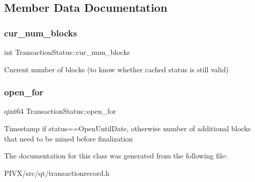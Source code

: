 \subsection{Member Data Documentation}
\mbox{\label{class_transaction_status_a22839cc23993e849a6c9fed8bffd5f50}} 
\subsubsection{\texorpdfstring{cur\+\_\+num\+\_\+blocks}{cur\_num\_blocks}}
{\footnotesize\ttfamily int Transaction\+Status\+::cur\+\_\+num\+\_\+blocks}

Current number of blocks (to know whether cached status is still valid) \mbox{\label{class_transaction_status_a861ed66c0fd49440bc1aacab5315a938}} 
\subsubsection{\texorpdfstring{open\+\_\+for}{open\_for}}
{\footnotesize\ttfamily qint64 Transaction\+Status\+::open\+\_\+for}

Timestamp if status==Open\+Until\+Date, otherwise number of additional blocks that need to be mined before finalization 

The documentation for this class was generated from the following file\+:\begin{DoxyCompactItemize}
\item 
P\+I\+V\+X/src/qt/transactionrecord.\+h\end{DoxyCompactItemize}
